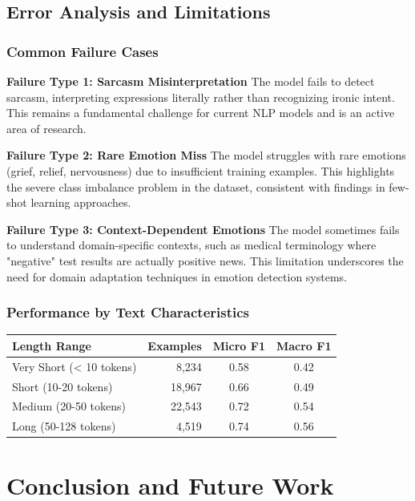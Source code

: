 \documentclass[12pt,a4paper]{article}
\begin{document}
\subsection{Error Analysis and Limitations}

\subsubsection{Common Failure Cases}

\textbf{Failure Type 1: Sarcasm Misinterpretation}
The model fails to detect sarcasm, interpreting expressions literally rather than recognizing ironic intent. This remains a fundamental challenge for current NLP models and is an active area of research.

\textbf{Failure Type 2: Rare Emotion Miss}
The model struggles with rare emotions (grief, relief, nervousness) due to insufficient training examples. This highlights the severe class imbalance problem in the dataset, consistent with findings in few-shot learning approaches.

\textbf{Failure Type 3: Context-Dependent Emotions}
The model sometimes fails to understand domain-specific contexts, such as medical terminology where "negative" test results are actually positive news. This limitation underscores the need for domain adaptation techniques in emotion detection systems.

\subsubsection{Performance by Text Characteristics}

\begin{tablebox}
\centering
\caption{Performance by Text Length}
\label{tab:length_performance}
\begin{tabular}{lrcc}
\toprule
\textbf{Length Range} & \textbf{Examples} & \textbf{Micro F1} & \textbf{Macro F1} \\
\midrule
Very Short (< 10 tokens) & 8,234 & 0.58 & 0.42 \\
Short (10-20 tokens) & 18,967 & 0.66 & 0.49 \\
Medium (20-50 tokens) & 22,543 & 0.72 & 0.54 \\
Long (50-128 tokens) & 4,519 & 0.74 & 0.56 \\
\bottomrule
\end{tabular}
\end{tablebox}

\section{Conclusion and Future Work}
\end{document}
